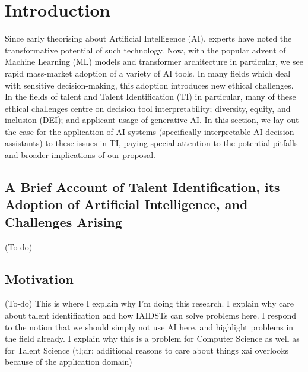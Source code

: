 

\chapter{\label{ch:intro}Introduction} 

\minitoc

Since early theorising about Artificial Intelligence (AI), experts have noted the transformative potential of such technology. Now, with the popular advent of Machine Learning (ML) models and transformer architecture in particular, we see rapid mass-market adoption of a variety of AI tools. In many fields which deal with sensitive decision-making, this adoption introduces new ethical challenges. In the fields of talent and Talent Identification (TI) in particular, many of these ethical challenges centre on decision tool interpretability; diversity, equity, and inclusion (DEI); and applicant usage of generative AI. In this section, we lay out the case for the application of AI systems (specifically interpretable AI decision assistants) to these issues in TI, paying special attention to the potential pitfalls and broader implications of our proposal.

\section{A Brief Account of Talent Identification, its Adoption of Artificial Intelligence, and Challenges Arising}
(To-do)

\section{Motivation}
(To-do) This is where I explain why I'm doing this research. I explain why care about talent identification and how IAIDSTs can solve problems here. I respond to the notion that we should simply not use AI here, and highlight problems in the field already. I explain why this is a problem for Computer Science as well as for Talent Science (tl;dr: additional reasons to care about things xai overlooks because of the application domain)

